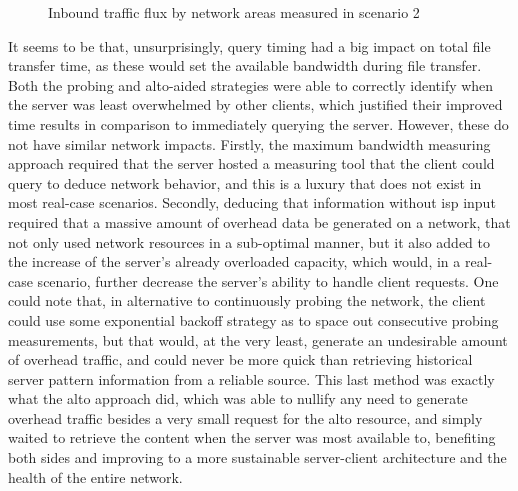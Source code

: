 \begin{figure}[H]
\caption{Inbound traffic flux by network areas measured in scenario 2}
\label{fig:graph-traffic-scenario2}
\end{figure}

    It seems to be that, unsurprisingly, query timing had a big impact on total file transfer time, as these would set the available bandwidth during file transfer.
    Both the probing and \gls{alto}-aided strategies were able to correctly identify when the server was least overwhelmed by other clients, which justified their improved time results in comparison to immediately querying the server.
    However, these do not have similar network impacts.
    Firstly, the maximum bandwidth measuring approach required that the server hosted a measuring tool that the client could query to deduce network behavior, and this is a luxury that does not exist in most real-case scenarios.
    Secondly, deducing that information without \gls{isp} input required that a massive amount of overhead data be generated on a network, that not only used network resources in a sub-optimal manner, but it also added to the increase of the server's already overloaded capacity, which would, in a real-case scenario, further decrease the server's ability to handle client requests. 
    One could note that, in alternative to continuously probing the network, the client could use some exponential backoff strategy as to space out consecutive probing measurements, but that would, at the very least, generate an undesirable amount of overhead traffic, and could never be more quick than retrieving historical server pattern information from a reliable source.
    This last method was exactly what the \gls{alto} approach did, which was able to nullify any need to generate overhead traffic besides a very small request for the \gls{alto} resource, and simply waited to retrieve the content when the server was most available to, benefiting both sides and improving to a more sustainable server-client architecture and the health of the entire network.

